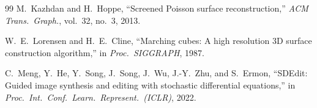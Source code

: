 \documentclass[conference]{IEEEtran}
\begin{document}
\begin{thebibliography}{99}
M.~Kazhdan and H.~Hoppe, ``Screened Poisson surface reconstruction,'' \emph{ACM Trans.\
Graph.}, vol.~32, no.~3, 2013.

W.~E.~Lorensen and H.~E.~Cline, ``Marching cubes: A high resolution 3D surface
construction algorithm,'' in \emph{Proc.\ SIGGRAPH}, 1987.

C.~Meng, Y.~He, Y.~Song, J.~Song, J.~Wu, J.-Y.~Zhu, and S.~Ermon, ``SDEdit: Guided
image synthesis and editing with stochastic differential equations,'' in \emph{Proc.\
Int.\ Conf.\ Learn.\ Represent.\ (ICLR)}, 2022.

\end{thebibliography}
\end{document}

